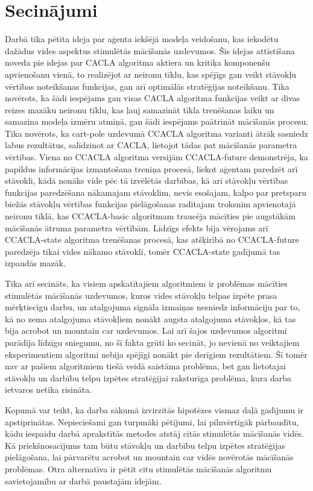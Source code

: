 \documentclass{ludis} %
\begin{document}
\chapter{Secinājumi}
Darbā tika pētīta ideja par aģenta iekšējā modeļa veidošanu, kas iekodētu
dažādus vides aspektus stimulētās mācīšanās uzdevumos. Šīs idejas attīstīšana
noveda pie idejas par CACLA algoritma aktiera un kritiķa komponenšu apvienošanu
vienā, to realizējot ar neironu tīklu, kas spējīgs gan veikt stāvokļu vērtības
noteikšanas funkcijas, gan arī optimālās stratēģijas noteikšanu. Tika novērots,
ka šādi iespējams gan visas CACLA algoritma funkcijas veikt ar divas reizes
mazāku neironu tīklu, kas ļauj samazināt tīkla trenēšanas laiku un samazina
modeļa izmēru atmiņā, gan šādi iespējams paātrināt mācīšanās procesu. Tika
novērots, ka cart-pole uzdevumā CCACLA algoritma varianti ātrāk sasniedz labus
rezultātus, salīdzinot ar CACLA, lietojot tādas pat mācīšanās parametra
vērtības. Viena no CCACLA algoritma versijām CCACLA-future demonstrēja, ka
papildus informācijas izmantošana treniņa procesā, liekot aģentam paredzēt arī
stāvokli, kādā nonāks vide pēc tā izvēlētās darbības, kā arī stāvokļu vērtības
funkcijas paredzēšana nākamajam stāvoklim, nevis esošajam, kalpo par pretsparu
biežās stāvokļu vērtības funkcijas pielāgošanas radītajam troksnim apvienotajā
neironu tīklā, kas CCACLA-basic algoritmam traucēja mācīties pie augstākām
mācīšanās ātruma parametra vērtībām. Līdzīgs efekts bija vērojams arī
CCACLA-state algoritma trenēšanas procesā, kas atšķirībā no CCACLA-future
paredzēja tikai vides nākamo stāvokli, tomēr CCACLA-state gadījumā tas izpaudās
mazāk.

Tika arī secināts, ka visiem apskatītajiem algoritmiem ir problēmas mācīties
stimulētās mācīšanās uzdevumos, kuros vides stāvokļu telpas izpēte prasa
mērķtiecīgu darbu, un atalgojuma signāla izmaiņas nesniedz informāciju par to,
kā no zema atalgojuma stāvokļiem nonākt augsta atalgojuma stāvokļos, kā tas bija
acrobot un mountain car uzdevumos. Lai arī šajos uzdevumos algoritmi parādīja
līdzīgu sniegumu, no šī fakta grūti ko secināt, jo nevienā no veiktajiem
eksperimentiem algoritmi nebija spējīgi nonākt pie derīgiem rezultātiem. Šī tomēr
nav ar pašiem algoritmiem tiešā veidā saistāma problēma, bet gan lietotajai
stāvokļu un darbību telpu izpētes stratēģijai raksturīga problēma, kura darba
ietvaros netika risināta.

Kopumā var teikt, ka darba sākumā izvirzītās hipotēzes vismaz daļā gadījumu
ir apstiprinātas. Nepieciešami gan turpmāki pētījumi, lai pilnvērtīgāk
pārbaudītu, kādu iespaidu darbā aprakstītās metodes atstāj citās stimulētās
mācīšanās vidēs. Kā priekšnosacījums tam būtu stāvokļu un darbību telpu izpētes
stratēģijas pielāgošana, lai pārvarētu acrobot un mountain car vidēs novērotās
mācīšanās problēmas. Otra alternatīva ir pētīt citu stimulētās mācīšanās
algoritmu savietojamību ar darbā paustajām idejām.


\printbibliography
\end{document}
